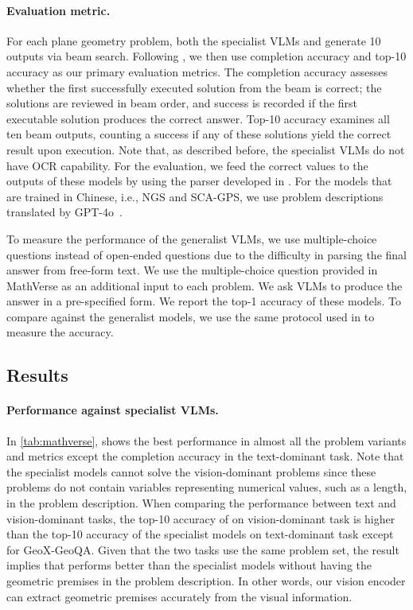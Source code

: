 \paragraph{Evaluation metric.}
For each plane geometry problem, both the specialist VLMs and \geovlm{} generate 10 outputs via beam search. Following \citet{pgps}, we then use completion accuracy and top-10 accuracy as our primary evaluation metrics. The completion accuracy assesses whether the first successfully executed solution from the beam is correct; the solutions are reviewed in beam order, and success is recorded if the first executable solution produces the correct answer. Top-10 accuracy examines all ten beam outputs, counting a success if any of these solutions yield the correct result upon execution. Note that, as described before, the specialist VLMs do not have OCR capability. For the evaluation, we feed the correct values to the outputs of these models by using the parser developed in \citet{pgps}. For the models that are trained in Chinese, i.e., NGS and SCA-GPS, we use problem descriptions translated by GPT-4o~\citep{gpt4o}.

To measure the performance of the generalist VLMs, we use multiple-choice questions instead of open-ended questions due to the difficulty in parsing the final answer from free-form text. We use the multiple-choice question provided in MathVerse as an additional input to each problem. We ask VLMs to produce the answer in a pre-specified form. We report the top-1 accuracy of these models.
To compare \geovlm{} against the generalist models, we use the same protocol used in \citet{pgps} to measure the accuracy.

\subsection{Results}
\label{sec:experiments}

\paragraph{Performance against specialist VLMs.}
In \cref{tab:mathverse}, \geovlm{} shows the best performance in almost all the problem variants and metrics except the completion accuracy in the text-dominant task. Note that the specialist models cannot solve the vision-dominant problems since these problems do not contain variables representing numerical values, such as a length, in the problem description.
When comparing the performance between text and vision-dominant tasks, the top-10 accuracy of \geovlm{} on vision-dominant task is higher than the top-10 accuracy of the specialist models on text-dominant task except for GeoX-GeoQA. Given that the two tasks use the same problem set, the result implies that \geovlm{} performs better than the specialist models without having the geometric premises in the problem description. In other words, our vision encoder can extract geometric premises accurately from the visual information.


